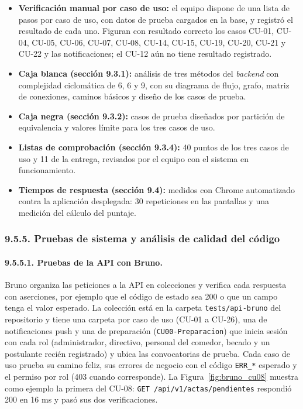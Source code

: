 \begin{itemize}
    \item \textbf{Verificación manual por caso de uso:} el equipo dispone de una lista de pasos por caso de uso, con datos de prueba cargados en la base, y registró el resultado de cada uno. Figuran con resultado correcto los casos CU-01, CU-04, CU-05, CU-06, CU-07, CU-08, CU-14, CU-15, CU-19, CU-20, CU-21 y CU-22 y las notificaciones; el CU-12 aún no tiene resultado registrado.
    \item \textbf{Caja blanca (sección 9.3.1):} análisis de tres métodos del \textit{backend} con complejidad ciclomática de 6, 6 y 9, con su diagrama de flujo, grafo, matriz de conexiones, caminos básicos y diseño de los casos de prueba.
    \item \textbf{Caja negra (sección 9.3.2):} casos de prueba diseñados por partición de equivalencia y valores límite para los tres casos de uso.
    \item \textbf{Listas de comprobación (sección 9.3.4):} 40 puntos de los tres casos de uso y 11 de la entrega, revisados por el equipo con el sistema en funcionamiento.
    \item \textbf{Tiempos de respuesta (sección 9.4):} medidos con Chrome automatizado contra la aplicación desplegada: 30 repeticiones en las pantallas y una medición del cálculo del puntaje.
\end{itemize}

\subsubsection{9.5.5. Pruebas de sistema y análisis de calidad del código}

\paragraph{9.5.5.1. Pruebas de la API con Bruno.}

Bruno organiza las peticiones a la API en colecciones y verifica cada respuesta con aserciones, por ejemplo que el código de estado sea 200 o que un campo tenga el valor esperado. La colección está en la carpeta \texttt{tests/api-bruno} del repositorio y tiene una carpeta por caso de uso (CU-01 a CU-26), una de notificaciones push y una de preparación (\texttt{CU00-Preparacion}) que inicia sesión con cada rol (administrador, directivo, personal del comedor, becado y un postulante recién registrado) y ubica las convocatorias de prueba. Cada caso de uso prueba su camino feliz, sus errores de negocio con el código \texttt{ERR\_*} esperado y el permiso por rol (403 cuando corresponde). La Figura~\ref{fig:bruno_cu08} muestra como ejemplo la primera del CU-08: \texttt{GET /api/v1/actas/pendientes} respondió 200 en 16 ms y pasó sus dos verificaciones.

